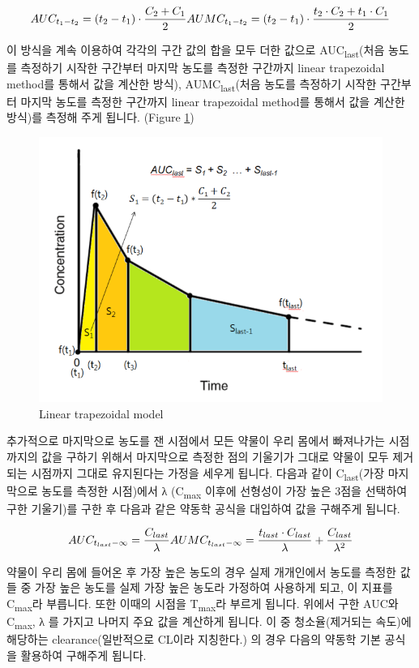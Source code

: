 \documentclass[12pt,]{krantz}
\theoremstyle{definition}
\theoremstyle{definition}
\theoremstyle{definition}
\theoremstyle{remark}
\begin{document}
\[
AUC_{t_1-t_2} = 
  (t_2-t_1)\cdot \frac{C_2+C_1}{2} \\
AUMC_{t_1-t_2} = 
  (t_2-t_1)\cdot \frac{t_2 \cdot C_2 + t_1 \cdot C_1}{2}
\]

이 방식을 계속 이용하여 각각의 구간 값의 합을 모두 더한 값으로
AUC\textsubscript{last}(처음 농도를 측정하기 시작한 구간부터 마지막
농도를 측정한 구간까지 linear trapezoidal method를 통해서 값을 계산한
방식), AUMC\textsubscript{last}(처음 농도를 측정하기 시작한 구간부터
마지막 농도를 측정한 구간까지 linear trapezoidal method를 통해서 값을
계산한 방식)를 측정해 주게 됩니다. (Figure \ref{fig:trapezoid})

\begin{figure}
\includegraphics[width=9.12in]{assets/trapezoidal} \caption{Linear trapezoidal model}\label{fig:trapezoid}
\end{figure}

추가적으로 마지막으로 농도를 잰 시점에서 모든 약물이 우리 몸에서
빠져나가는 시점까지의 값을 구하기 위해서 마지막으로 측정한 점의 기울기가
그대로 약물이 모두 제거되는 시점까지 그대로 유지된다는 가정을 세우게
됩니다. 다음과 같이 C\textsubscript{last}(가장 마지막으로 농도를 측정한
시점)에서 λ (C\textsubscript{max} 이후에 선형성이 가장 높은 3점을
선택하여 구한 기울기)를 구한 후 다음과 같은 약동학 공식을 대입하여 값을
구해주게 됩니다.

\[
AUC_{t_{last}-\infty} = 
  \frac{C_{last}}{\lambda} \\
AUMC_{t_{last}-\infty} = 
  \frac{t_{last} \cdot C_{last}}{\lambda} + 
  \frac{C_{last}}{\lambda^2}
\]

약물이 우리 몸에 들어온 후 가장 높은 농도의 경우 실제 개개인에서 농도를
측정한 값들 중 가장 높은 농도를 실제 가장 높은 농도라 가정하여 사용하게
되고, 이 지표를 C\textsubscript{max}라 부릅니다. 또한 이때의 시점을
T\textsubscript{max}라 부르게 됩니다. 위에서 구한 AUC와
C\textsubscript{max}, λ 를 가지고 나머지 주요 값을 계산하게 됩니다. 이
중 청소율(제거되는 속도)에 해당하는 clearance(일반적으로 CL이라
지칭한다.) 의 경우 다음의 약동학 기본 공식을 활용하여 구해주게 됩니다.
\end{document}
